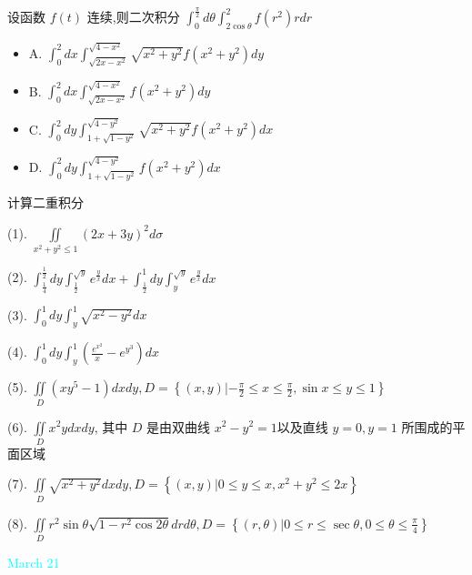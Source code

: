 \begin{example}[][Exam: 29.3.11]
	设函数 $f(t)$ 连续,则二次积分 $\int_{0}^{\frac{\pi}{2}}d\theta\int_{2\cos\theta}^{2}f(r^{2})rdr$
\begin{itemize}
	\item A. $\int_{0}^{2}dx\int_{\sqrt{2x-x^{2}}}^{\sqrt{4-x^{2}}}\sqrt{x^{2}+y^{2}}f(x^{2}+y^{2})dy$
	\item B. $\int_{0}^{2}dx\int_{\sqrt{2x-x^{2}}}^{\sqrt{4-x^{2}}}f(x^{2}+y^{2})dy$
	\item C. $\int_{0}^{2}dy\int_{1+\sqrt{1-y^{2}}}^{\sqrt{4-y^{2}}}\sqrt{x^{2}+y^{2}}f(x^{2}+y^{2})dx$
	\item D. $\int_{0}^{2}dy\int_{1+\sqrt{1-y^{2}}}^{\sqrt{4-y^{2}}}f(x^{2}+y^{2})dx$
\end{itemize}
\end{example}

\begin{example}[][Exam: 29.3.12]
	计算二重积分

(1). $\displaystyle{\iint\limits_{x^{2}+y^{2}\leq 1}(2x+3y)^{2}d\sigma}$

(2). $\displaystyle{\int_{\frac{1}{4}}^{\frac{1}{2}}dy\int_{\frac{1}{2}}^{\sqrt{y}}e^{\frac{y}{x}}dx+\int_{\frac{1}{2}}^{1}dy\int_{y}^{\sqrt{y}}e^{\frac{y}{x}}dx}$

(3). $\displaystyle{\int_{0}^{1}dy\int_{y}^{1}\sqrt{x^{2}-y^{2}}dx}$

(4). $\displaystyle{\int_{0}^{1}dy\int_{y}^{1}\left(\frac{e^{x^{2}}}{x}-e^{y^{3}}\right)dx}$

(5). $\displaystyle{\iint\limits_{D}\left(xy^{5}-1\right)dxdy,D=\left\{(x,y)|-\frac{\pi}{2}\leq x \leq \frac{\pi}{2},\sin x\leq y \leq 1 \right\}}$

(6). $\displaystyle{\iint\limits_{D}x^{2}ydxdy}$, 其中 $D$ 是由双曲线 $x^{2}-y^{2}=1$以及直线 $y=0,y=1$ 所围成的平面区域

(7). $\displaystyle{\iint\limits_{D}\sqrt{x^{2}+y^{2}}dxdy,D=\left\{(x,y)|0\leq y \leq x, x^{2}+y^{2}\leq 2x\right\}}$

(8). $\displaystyle{\iint\limits_{D}r^{2}\sin\theta\sqrt{1-r^{2}\cos 2\theta}drd\theta,D=\left\{(r,\theta)|0\leq r\leq \sec\theta,0\leq \theta \leq \frac{\pi}{4}\right\}}$
\end{example}

\textcolor{cyan}{March 21}

